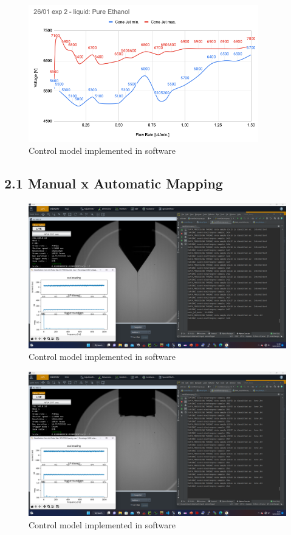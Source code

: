     \begin{figure}[H]
        \center
        \includegraphics[width=10cm]{images/image_folder_report_4/manualMap3.png}
        \caption{Control model implemented in software}
    \end{figure}


\subsection*{2.1 Manual x Automatic Mapping}


    \begin{figure}[H]
        \center
        \includegraphics[width=15cm]{images/image_folder_report_4/experiment_print1.png}
        \caption{Control model implemented in software}
    \end{figure}

    \begin{figure}[H]
        \center
        \includegraphics[width=15cm]{images/image_folder_report_4/multi_jet_print.png}
        \caption{Control model implemented in software}
    \end{figure}


